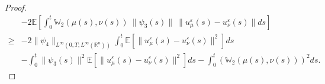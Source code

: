 \documentclass[11pt]{article}
\numberwithin{equation}{section}
\theoremstyle{plain}
\def\geq{\geqslant}
\begin{document}
\begin{proof}
\begin{align}
       & - 2 \mathbb{E}
              \left[ \int_0^t
                      \mathbb{W}_2 \left( \mu(s), \nu(s) \right) \
                        \|\psi_3(s)\| \
                        \| u_\mu^\varepsilon (s)
                              - u_\nu^\varepsilon (s)
                       \| ds
               \right]
               \nonumber \\
  \geq & - 2 \| \psi_4 \|_{L^\infty(0,T; L^\infty(\mathbb{R}^n) ) }
           \int_0^t \mathbb{E}
                      \left[ \| u_\mu^\varepsilon (s)
                             - u_\nu^\varepsilon (s) \|^2
                      \right] ds  \nonumber \\
       & - \int_0^t \| \psi_3(s) \|^2
                    \mathbb{E}
                      \left[ \| u_\mu^\varepsilon (s)
                             - u_\nu^\varepsilon (s) \|^2
                      \right] ds
         - \int_0^t
                    \left( \mathbb{W}_2 \left( \mu(s), \nu(s) \right)
                    \right)^2
            ds.
\end{align}


\end{proof}
\end{document}
